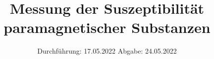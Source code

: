 

\subject{V606}
\title{Messung der Suszeptibilität paramagnetischer
Substanzen}
\date{%
  Durchführung: 17.05.2022
  \hspace{3em}
  Abgabe: 24.05.2022
}



\maketitle
\thispagestyle{empty}
\tableofcontents
\newpage







\printbibliography{}


